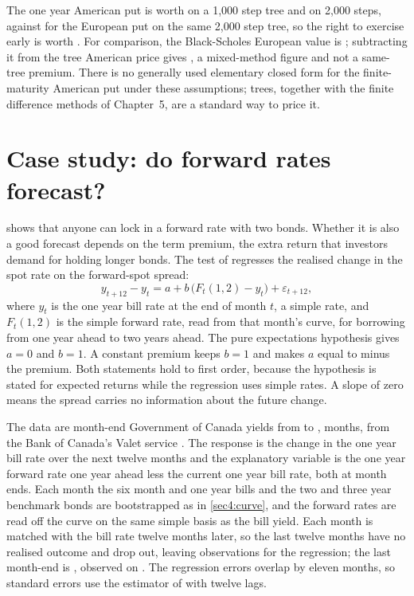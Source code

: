 \begin{chapterrefs}
The one year American put is worth \amPutThousand{} on a 1,000 step tree and \amPutTwoThousand{} on
2,000 steps, against \euPutTwoThousand{} for the European put on the same 2,000 step tree, so the right to exercise
early is worth \amPremiumTree. For comparison, the Black-Scholes European value is \bsPut; subtracting
it from the tree American price gives \amPremium, a mixed-method figure and not a same-tree premium. There is no generally used elementary closed form for the finite-maturity American
put under these assumptions; trees, together with the finite difference methods of Chapter~5, are a
standard way to price it.

\section{Case study: do forward rates forecast?}
\label{sec4:case}

 shows that anyone can lock in a forward rate with two bonds. Whether it is also a
good forecast depends on the term premium, the extra return that investors demand for holding longer
bonds. The test of \textcite{fama1987} regresses the realised change in the spot rate on the
forward-spot spread:
\begin{equation}\label{eq4:fb}
  y_{t+12}-y_t=a+b\,\bigl(F_t(1,2)-y_t\bigr)+\varepsilon_{t+12},
\end{equation}
where $y_t$ is the one year bill rate at the end of month $t$, a simple rate, and $F_t(1,2)$ is the
simple forward rate, read from that month's curve, for borrowing from one year ahead to two years
ahead. The pure expectations hypothesis gives $a=0$ and $b=1$. A constant premium keeps $b=1$ and makes
$a$ equal to minus the premium. Both statements hold to first order, because the hypothesis is stated
for expected returns while the regression uses simple rates. A slope of zero means the spread carries
no information about the future change.

The data are month-end Government of Canada yields from \fbStart{} to \fbEnd, \caseMonths{} months,
from the Bank of Canada's Valet service \parencite{bocvalet}. The response is the change in the one
year bill rate over the next twelve months and the explanatory variable is the one year forward rate
one year ahead less the current one year bill rate, both at month ends. Each month the six month and one year bills and the
two and three year benchmark bonds are bootstrapped as in \cref{sec4:curve}, and the forward rates are
read off the curve on the same simple basis as the bill yield. Each month is matched with the bill
rate twelve months later, so the last twelve months have no realised outcome and drop out, leaving
\fbOneN{} observations for the regression; the last month-end is \fbOneLastDate, observed on \gocDate. The regression
errors overlap by eleven months, so standard errors use the estimator of \textcite{newey1987} with
twelve lags.


\end{chapterrefs}
